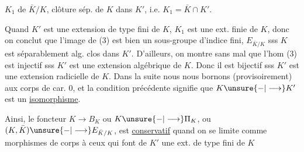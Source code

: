 $K_1$ de $\bar K/K$, clôture  sép. de $K$ dans $K'$, i.e. $K_1=\bar K\cap K'$.

Quand $K'$ est une extension de type fini de $K$, $K_1$ est une ext. finie de $K$, donc on conclut que l'image de (3) est bien un sous-groupe d'indice fini,   $E_{\bar K/K}$ sss  $K$ est séparablement alg. clos dans $K'$. D'ailleurs, on montre sans mal que  l'hom (3) est injectif sss $K'$ est une extension algébrique de $K$. Donc il est bijectif sss $K'$ est une extension radicielle de $K$. Dans la suite nous nous bornons (provisoirement) aux corps de car. $0$, et la condition précédente signifie  que $K\unsure{-|\longrightarrow}K'$ est un \uline{isomorphisme}.

Ainsi, le foncteur $K\longrightarrow B_K$ ou $K\unsure{-|\longrightarrow}\Pi_K$, ou $(K,\bar K)\unsure{-|\longrightarrow}E_{\bar K/K}$, est \uline{conservatif} quand on se limite comme morphismes de corps  à ceux  qui font de $K'$ une ext. de type fini de $K$
